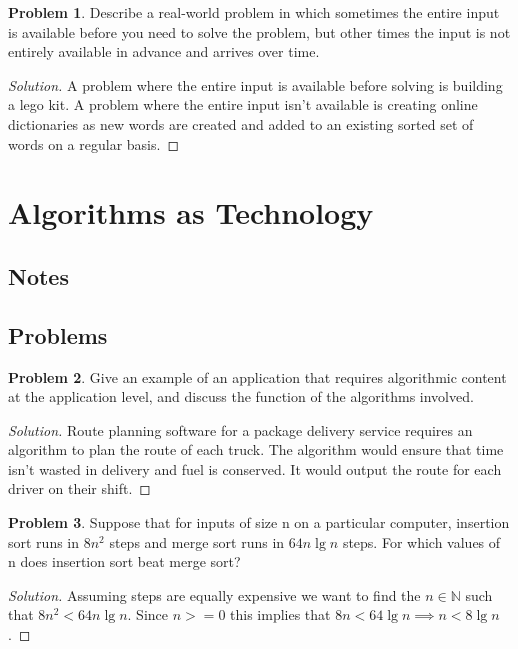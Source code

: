\documentclass[oneside]{book}
\theoremstyle{definition}
\newtheorem{problem}{Problem}[section]
\theoremstyle{plain}
\begin{document}
\begin{spacing}{1.618}
\begin{problem}
	Describe a real-world problem in which sometimes the entire input is available before you need to solve the problem, but other times the input is not entirely available in advance and arrives over time.
	\begin{proof}[Solution]
		A problem where the entire input is available before solving is building a lego kit. A problem where the entire input isn't available is creating online dictionaries as new words are created and added to an existing sorted set of words on a regular basis. 
	\end{proof}
\end{problem}

\section{Algorithms as Technology}

\subsection{Notes}

\subsection{Problems}

\begin{problem}
	Give an example of an application that requires algorithmic content at the application level, and discuss the function of the algorithms involved.
	\begin{proof}[Solution]
		Route planning software for a package delivery service requires an algorithm to plan the route of each truck. The algorithm would ensure that time isn't wasted in delivery and fuel is conserved. It would output the route for each driver on their shift. 
	\end{proof}
\end{problem}

\begin{problem}
	Suppose that for inputs of size n on a particular computer, insertion sort runs in $8n^2$ steps and merge sort runs in $64n\lg{n}$ steps. For which values of n does insertion sort beat merge sort?
	\begin{proof}[Solution]
		Assuming steps are equally expensive we want to find the $n\in\mathbb{N}$ such that $8n^2 < 64n\lg{n}$. Since $n>=0$ this implies that $8n < 64\lg{n}\implies n < 8\lg{n}$. 
		

\end{proof}
\end{problem}
\end{spacing}
\end{document}
